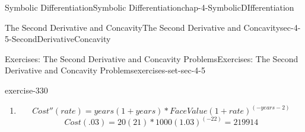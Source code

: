 \documentclass[oneside,10pt,]{book}
\numberwithin{equation}{section}
\begin{document}
\begin{chapterptx}{Symbolic Differentiation}{}{Symbolic Differentiation}{}{}{chap-4-SymbolicDIfferentiation}
\begin{sectionptx}{The Second Derivative and Concavity}{}{The Second Derivative and Concavity}{}{}{sec-4-5-SecondDerivativeConcavity}
\begin{exercises-subsection-numberless}{Exercises: The Second Derivative and Concavity Problems}{}{Exercises: The Second Derivative and Concavity Problems}{}{}{exercises-set-sec-4-5}
\begin{exercisegroup}
\begin{divisionexerciseeg}{17}{}{}{exercise-330}
\begin{enumerate}[label=(\alph*)]
\begin{equation*}
Cost(rate)=-years*FaceValue(1+rate)^{(-years-1)}
\end{equation*}
%
\begin{equation*}
Cost'(.03)=-20*1000(1.03)^{-21}=-8000
\end{equation*}
%
\item\hypertarget{li-566}{}%
\begin{equation*}
Cost''(rate)=years(1+years)*FaceValue(1+rate)^{(-years-2)}
\end{equation*}
%
\begin{equation*}
Cost(.03)=20(21)*1000(1.03)^(-22)=219914
\end{equation*}
%
\end{enumerate}
\end{divisionexerciseeg}%
\end{exercisegroup}
\par\medskip\noindent
\end{exercises-subsection-numberless}
\end{sectionptx}
\end{chapterptx}
%
%
\typeout{************************************************}
\typeout{************************************************}
%
\end{document}
